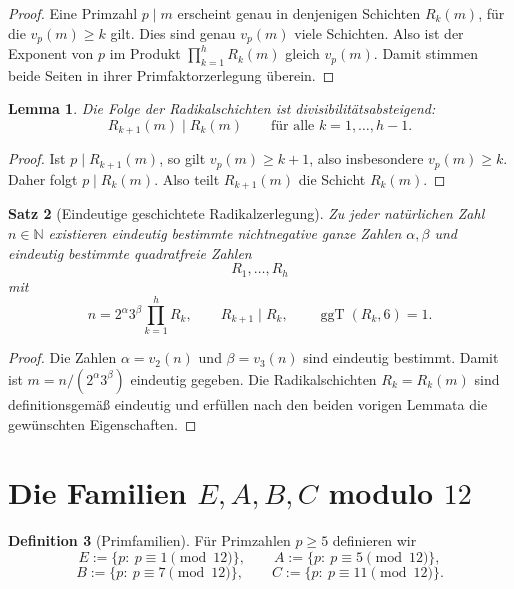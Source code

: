\documentclass[11pt,a4paper]{article}
\newtheorem{satz}{Satz}
\newtheorem{lemma}[satz]{Lemma}
\theoremstyle{definition}
\newtheorem{definition}[satz]{Definition}
\theoremstyle{remark}
\newcommand{\N}{\mathbb{N}}
\newcommand{\ggT}{\operatorname{ggT}}
\begin{document}
	\begin{proof}
		Eine Primzahl \(p\mid m\) erscheint genau in denjenigen Schichten \(R_k(m)\), für die
		\(v_p(m)\ge k\) gilt. Dies sind genau \(v_p(m)\) viele Schichten. Also ist der Exponent von \(p\)
		im Produkt \(\prod_{k=1}^{h}R_k(m)\) gleich \(v_p(m)\). Damit stimmen beide Seiten in ihrer
		Primfaktorzerlegung überein.
	\end{proof}
	
	\begin{lemma}
		Die Folge der Radikalschichten ist divisibilitätsabsteigend:
		\[
		R_{k+1}(m)\mid R_k(m)
		\qquad\text{für alle }k=1,\dots,h-1.
		\]
	\end{lemma}
	
	\begin{proof}
		Ist \(p\mid R_{k+1}(m)\), so gilt \(v_p(m)\ge k+1\), also insbesondere \(v_p(m)\ge k\). Daher
		folgt \(p\mid R_k(m)\). Also teilt \(R_{k+1}(m)\) die Schicht \(R_k(m)\).
	\end{proof}
	
	\begin{satz}[Eindeutige geschichtete Radikalzerlegung]
		Zu jeder natürlichen Zahl \(n\in\N\) existieren eindeutig bestimmte nichtnegative ganze Zahlen
		\(\alpha,\beta\) und eindeutig bestimmte quadratfreie Zahlen
		\[
		R_1,\dots,R_h
		\]
		mit
		\[
		n=2^\alpha 3^\beta \prod_{k=1}^{h}R_k,
		\qquad
		R_{k+1}\mid R_k,
		\qquad
		\ggT(R_k,6)=1.
		\]
	\end{satz}
	
	\begin{proof}
		Die Zahlen \(\alpha=v_2(n)\) und \(\beta=v_3(n)\) sind eindeutig bestimmt. Damit ist
		\(m=n/(2^\alpha 3^\beta)\) eindeutig gegeben. Die Radikalschichten \(R_k=R_k(m)\) sind
		definitionsgemäß eindeutig und erfüllen nach den beiden vorigen Lemmata die gewünschten
		Eigenschaften.
	\end{proof}
	
	\section{Die Familien \(E,A,B,C\) modulo \(12\)}
	
	\begin{definition}[Primfamilien]
		Für Primzahlen \(p\ge 5\) definieren wir
		\[
		E:=\{p:\ p\equiv 1 \pmod{12}\},\qquad
		A:=\{p:\ p\equiv 5 \pmod{12}\},
		\]
		\[
		B:=\{p:\ p\equiv 7 \pmod{12}\},\qquad
		C:=\{p:\ p\equiv 11 \pmod{12}\}.
		\]
	\end{definition}
	
\end{document}
